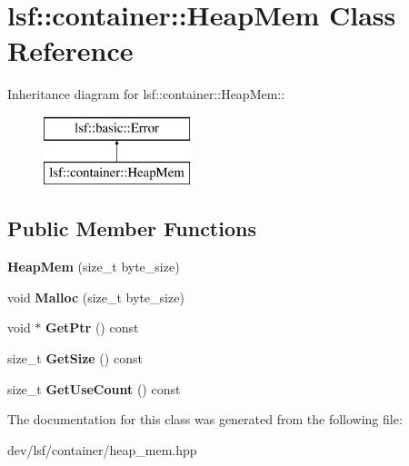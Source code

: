 \hypertarget{classlsf_1_1container_1_1HeapMem}{
\section{lsf::container::HeapMem Class Reference}
\label{classlsf_1_1container_1_1HeapMem}
}
Inheritance diagram for lsf::container::HeapMem::\begin{figure}[H]
\begin{center}
\leavevmode
\includegraphics[height=2cm]{classlsf_1_1container_1_1HeapMem}
\end{center}
\end{figure}
\subsection*{Public Member Functions}
\begin{DoxyCompactItemize}
\item 
\hypertarget{classlsf_1_1container_1_1HeapMem_a6c27c0e241eb309cbb3dc1178a8f8213}{
{\bfseries HeapMem} (size\_\-t byte\_\-size)}
\label{classlsf_1_1container_1_1HeapMem_a6c27c0e241eb309cbb3dc1178a8f8213}

\item 
\hypertarget{classlsf_1_1container_1_1HeapMem_a67f599680ce40b7329f8fa5690a26c90}{
void {\bfseries Malloc} (size\_\-t byte\_\-size)}
\label{classlsf_1_1container_1_1HeapMem_a67f599680ce40b7329f8fa5690a26c90}

\item 
\hypertarget{classlsf_1_1container_1_1HeapMem_a49be32275cc2b6be267a95480a6d75c5}{
void $\ast$ {\bfseries GetPtr} () const }
\label{classlsf_1_1container_1_1HeapMem_a49be32275cc2b6be267a95480a6d75c5}

\item 
\hypertarget{classlsf_1_1container_1_1HeapMem_a02a93262e5348e2b91dd912912680f51}{
size\_\-t {\bfseries GetSize} () const }
\label{classlsf_1_1container_1_1HeapMem_a02a93262e5348e2b91dd912912680f51}

\item 
\hypertarget{classlsf_1_1container_1_1HeapMem_a8364cacd04f3973b019ab44bb009cb41}{
size\_\-t {\bfseries GetUseCount} () const }
\label{classlsf_1_1container_1_1HeapMem_a8364cacd04f3973b019ab44bb009cb41}

\end{DoxyCompactItemize}


The documentation for this class was generated from the following file:\begin{DoxyCompactItemize}
\item 
dev/lsf/container/heap\_\-mem.hpp\end{DoxyCompactItemize}
